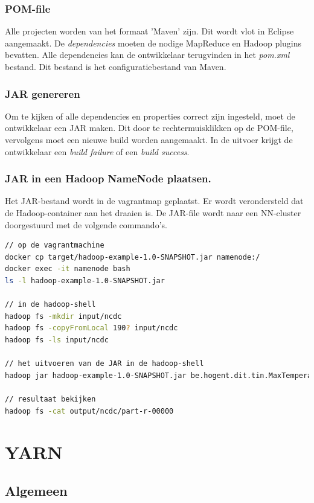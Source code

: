 \documentclass[a4paper,10pt,twoside]{report}
\begin{document}
\subsubsection{POM-file}
Alle projecten worden van het formaat 'Maven' zijn. Dit wordt vlot in Eclipse aangemaakt. De \textit{dependencies} moeten de nodige MapReduce en Hadoop plugins bevatten. Alle dependencies kan de ontwikkelaar terugvinden in het \textit{pom.xml} bestand. Dit bestand is het configuratiebestand van Maven.

\subsubsection{JAR genereren}

Om te kijken of alle dependencies en properties correct zijn ingesteld, moet de ontwikkelaar een JAR maken. Dit door te rechtermuisklikken op de POM-file, vervolgens moet een nieuwe build worden aangemaakt.  In de uitvoer krijgt de ontwikkelaar een \textit{build failure} of een \textit{build success}.

\subsubsection{JAR in een Hadoop NameNode plaatsen.}

Het JAR-bestand wordt in de vagrantmap geplaatst. Er wordt verondersteld dat de Hadoop-container aan het draaien is. De JAR-file wordt naar een NN-cluster doorgestuurd met de volgende commando's.

\begin{lstlisting}[language=Bash]
// op de vagrantmachine
docker cp target/hadoop-example-1.0-SNAPSHOT.jar namenode:/
docker exec -it namenode bash
ls -l hadoop-example-1.0-SNAPSHOT.jar

// in de hadoop-shell
hadoop fs -mkdir input/ncdc
hadoop fs -copyFromLocal 190? input/ncdc
hadoop fs -ls input/ncdc

// het uitvoeren van de JAR in de hadoop-shell
hadoop jar hadoop-example-1.0-SNAPSHOT.jar be.hogent.dit.tin.MaxTemperature input/ncdc output/ncdc

// resultaat bekijken
hadoop fs -cat output/ncdc/part-r-00000
\end{lstlisting}

\section{YARN}

\subsection{Algemeen}
\end{document}
